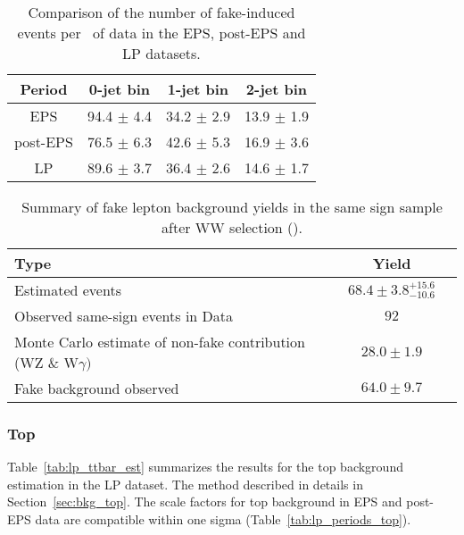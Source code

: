 \begin{table}[!htbp]
\begin{center}
\begin{tabular}{c c c c}
\hline
Period & 0-jet bin & 1-jet bin & 2-jet bin \\
\hline
EPS      & 94.4 $\pm$ 4.4 & 34.2 $\pm$ 2.9 & 13.9 $\pm$ 1.9 \\
post-EPS & 76.5 $\pm$ 6.3 & 42.6 $\pm$ 5.3 & 16.9 $\pm$ 3.6 \\
LP       & 89.6 $\pm$ 3.7 & 36.4 $\pm$ 2.6 & 14.6 $\pm$ 1.7 \\
\hline
\end{tabular}
\caption{Comparison of the number of fake-induced events per \ifb~of data in the EPS, post-EPS and LP datasets.}
\label{tab:lp_periods_fake}
\end{center}
\end{table}

\begin{table}[!htbp]
\begin{center}
\begin{tabular}{|l|c|c|}
\hline
Type                                                             & Yield \\
\hline
Estimated events                                                 &  $68.4\pm3.8^{+15.6}_{-10.6}$  \\
\hline
Observed same-sign events in Data                                &  $92$        \\
Monte Carlo estimate of non-fake contribution (WZ \& W$\gamma)$  & $28.0\pm1.9$ \\
Fake background observed                                         & $64.0\pm9.7$ \\
\hline
\end{tabular}
\caption{Summary of fake lepton background yields in the same sign sample after WW selection (\lpintlumi). }
\label{tab:lp_FakeLeptonBkgPrediction_SameSignSample}
\end{center}
\end{table}

\subsubsection{Top}

Table~\ref{tab:lp_ttbar_est} summarizes the results for the top background estimation in the LP dataset. 
The method described in details in Section~\ref{sec:bkg_top}.
The scale factors for top background in EPS and post-EPS data are compatible within one sigma (Table~\ref{tab:lp_periods_top}).

